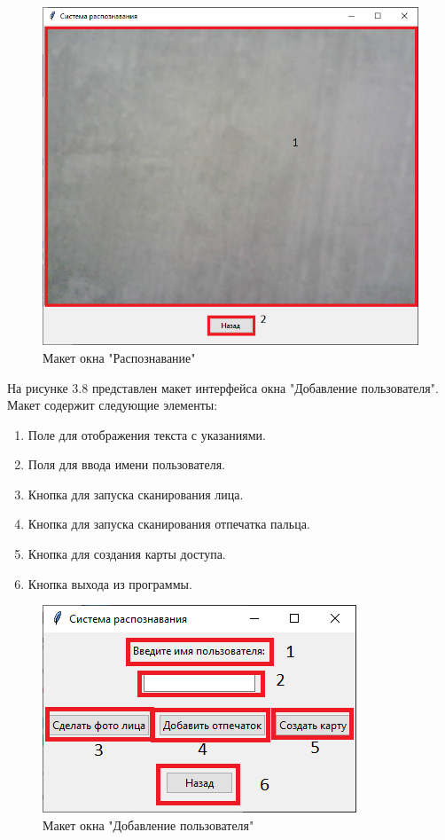\begin{figure}[H]
	\centering
	\includegraphics[width=0.7\linewidth]{images/maket3}
	\caption{Макет окна "Распознавание"}
	\label{fig:maket3}
\end{figure}

На рисунке 3.8 представлен макет интерфейса окна "Добавление пользователя". Макет содержит следующие элементы:

\begin{enumerate}
	\item Поле для отображения текста с указаниями. 
	\item Поля для ввода имени пользователя.
	\item Кнопка для запуска сканирования лица.
	\item Кнопка для запуска сканирования отпечатка пальца.
	\item Кнопка для создания карты доступа.
	\item Кнопка выхода из программы.
\end{enumerate}

\begin{figure}[H]
	\centering
	\includegraphics[width=0.7\linewidth]{images/maket1}
	\caption{Макет окна "Добавление пользователя"}
	\label{fig:maket1}
\end{figure}

\newpage